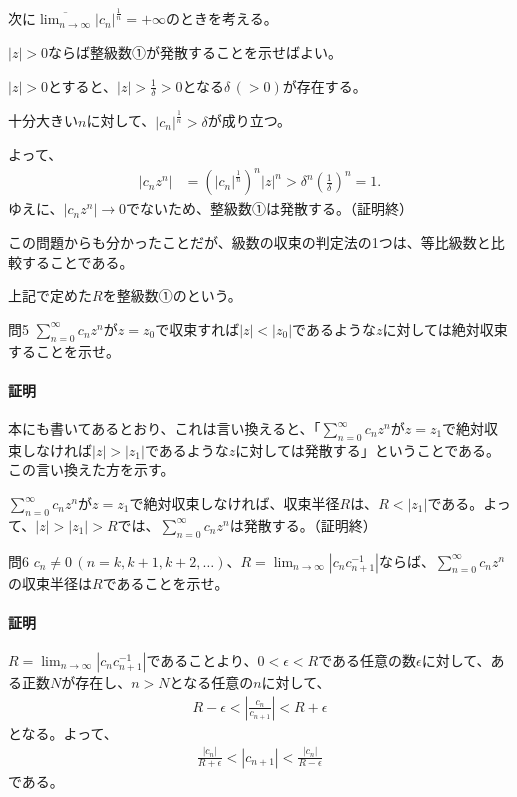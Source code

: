 次に$\displaystyle\overline{\lim_{n\to\infty}}|c_n|^{\frac{1}{n}}=+\infty$のときを考える。

$|z|>0$ならば整級数①が発散することを示せばよい。

$|z|>0$とすると、$|z|>\frac{1}{\delta}>0$となる$\delta\,(>0)$が存在する。

十分大きい$n$に対して、$|c_n|^\frac{1}{n}>\delta$が成り立つ。

よって、
\begin{align*}
    |c_nz^n|&=\left(|c_n|^\frac{1}{n}\right)^n|z|^n>\delta^n\left(\frac{1}{\delta}\right)^n
    =1.
\end{align*}
ゆえに、$|c_nz^n|\to 0$でないため、整級数①は発散する。（証明終）

この問題からも分かったことだが、級数の収束の判定法の1つは、等比級数と比較することである。

上記で定めた$R$を整級数①のという。


\begin{mysimplebox}{問5}
    $\sum_{n=0}^\infty c_nz^n$が$z=z_0$で収束すれば$|z|<|z_0|$であるような$z$に対しては絶対収束することを示せ。
\end{mysimplebox}
\paragraph{証明}
本にも書いてあるとおり、これは言い換えると、「$\sum_{n=0}^\infty c_nz^n$が$z=z_1$で絶対収束しなければ$|z|>|z_1|$であるような$z$に対しては発散する」ということである。この言い換えた方を示す。

$\sum_{n=0}^\infty c_nz^n$が$z=z_1$で絶対収束しなければ、収束半径$R$は、$R<|z_1|$である。よって、$|z|>|z_1|>R$では、$\sum_{n=0}^\infty c_nz^n$は発散する。（証明終）

\begin{mysimplebox}{問6}
    $c_n\neq 0\,(n=k, k+1, k+2,\dots)$、$R=\lim_{n\to\infty}|c_nc_{n+1}^{-1}|$ならば、$\sum_{n=0}^\infty c_nz^n$の収束半径は$R$であることを示せ。
\end{mysimplebox}
\paragraph{証明}
$R=\lim_{n\to\infty}|c_nc_{n+1}^{-1}|$であることより、$0<\epsilon<R$である任意の数$\epsilon$に対して、ある正数$N$が存在し、$n>N$となる任意の$n$に対して、
\begin{align*}
    R-\epsilon<\left|\frac{c_n}{c_{n+1}}\right|<R+\epsilon
\end{align*}
となる。よって、
\begin{align*}
    \frac{|c_n|}{R+\epsilon}<|c_{n+1}|<\frac{|c_n|}{R-\epsilon}
\end{align*}    
である。

